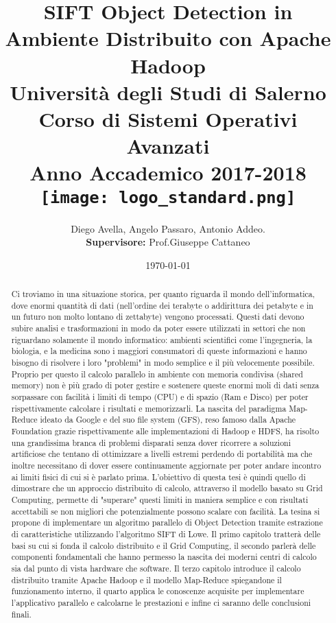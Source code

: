 \documentclass[12pt,a4paper,oneside]{report}
\title{
  \textbf{SIFT Object Detection in Ambiente Distribuito con Apache Hadoop}\\
  {\large Università degli Studi di Salerno}\\
  {\large Corso di Sistemi Operativi Avanzati}\\
  {\large Anno Accademico 2017-2018}\\
  \vspace{0.5cm}
  {\texttt{[image: logo\_standard.png]}}
}
\author{Diego Avella, Angelo Passaro, Antonio Addeo.\\{\small \textbf{Supervisore:} Prof.Giuseppe Cattaneo}}
\date{\today}
\begin{document}
  \maketitle
  \begin{abstract}
    Ci troviamo in una situazione storica, per quanto riguarda il mondo dell'informatica, dove enormi quantità di dati (nell'ordine dei terabyte o addirittura dei petabyte e in un  futuro non molto lontano di zettabyte) vengono processati. Questi dati devono subire analisi e trasformazioni in modo da poter essere utilizzati in settori che non riguardano solamente il mondo informatico: ambienti scientifici come l'ingegneria, la biologia, e la medicina sono i maggiori consumatori di queste informazioni e hanno bisogno di risolvere i loro "problemi" in modo semplice e il più velocemente possibile. Proprio per questo il calcolo parallelo in ambiente con memoria condivisa (shared memory) non è più grado di poter gestire e sostenere queste enormi moli di dati senza sorpassare con facilità i limiti di tempo (CPU) e di spazio (Ram e Disco) per poter rispettivamente calcolare i risultati e memorizzarli. La nascita del paradigma Map-Reduce ideato da Google e del suo file system (GFS), reso famoso dalla Apache Foundation grazie rispettivamente alle implementazioni di Hadoop e HDFS, ha risolto una grandissima branca di problemi disparati senza dover ricorrere a soluzioni artificiose che tentano di ottimizzare a livelli estremi perdendo di portabilità ma che inoltre necessitano di dover essere continuamente aggiornate per poter andare incontro ai limiti fisici di cui si è parlato prima. L'obiettivo di questa tesi è quindi quello di dimostrare che un approccio distribuito di calcolo, attraverso il modello basato su Grid Computing, permette di "superare" questi limiti in maniera semplice e con risultati accettabili se non migliori che potenzialmente possono scalare con facilità. La tesina si propone di implementare un algoritmo parallelo di Object Detection tramite estrazione di caratteristiche utilizzando l'algoritmo SIFT di Lowe. Il primo capitolo tratterà delle basi su cui si fonda il calcolo distribuito e il Grid Computing, il secondo parlerà delle componenti fondamentali che hanno permesso la nascita dei moderni centri di calcolo sia dal punto di vista hardware che software. Il terzo capitolo introduce il calcolo distribuito tramite Apache Hadoop e il modello Map-Reduce spiegandone il funzionamento interno, il quarto applica le conoscenze acquisite per implementare l'applicativo parallelo e calcolarne le prestazioni e infine ci saranno delle conclusioni finali.
  \end{abstract}
  \tableofcontents
  \listoffigures
\end{document}
